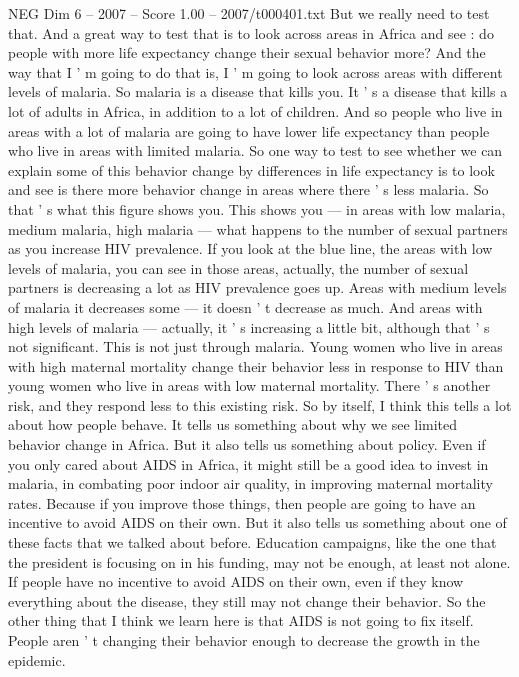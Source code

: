 \begin{textsample}{NEG Dim 6 – 2007 – Score 1.00 – 2007/t000401.txt}
But we really need to test that.
And a great way to test that is to look across areas in Africa and see : do people with more life expectancy change their sexual behavior more?
And the way that I ' m going to do that is, I ' m going to look across areas with different levels of malaria.
So malaria is a disease that kills you.
It ' s a disease that kills a lot of adults in Africa, in addition to a lot of children.
And so people who live in areas with a lot of malaria are going to have lower life expectancy than people who live in areas with limited malaria.
So one way to test to see whether we can explain some of this behavior change by differences in life expectancy is to look and see is there more behavior change in areas where there ' s less malaria.
So that ' s what this figure shows you.
This shows you — in areas with low malaria, medium malaria, high malaria — what happens to the number of sexual partners as you increase HIV prevalence.
If you look at the blue line, the areas with low levels of malaria, you can see in those areas, actually, the number of sexual partners is decreasing a lot as HIV prevalence goes up.
Areas with medium levels of malaria it decreases some — it doesn ' t decrease as much.
And areas with high levels of malaria — actually, it ' s increasing a little bit, although that ' s not significant.
This is not just through malaria.
Young women who live in areas with high maternal mortality change their behavior less in response to HIV than young women who live in areas with low maternal mortality.
There ' s another risk, and they respond less to this existing risk.
So by itself, I think this tells a lot about how people behave.
It tells us something about why we see limited behavior change in Africa.
But it also tells us something about policy.
Even if you only cared about AIDS in Africa, it might still be a good idea to invest in malaria, in combating poor indoor air quality, in improving maternal mortality rates.
Because if you improve those things, then people are going to have an incentive to avoid AIDS on their own.
But it also tells us something about one of these facts that we talked about before.
Education campaigns, like the one that the president is focusing on in his funding, may not be enough, at least not alone.
If people have no incentive to avoid AIDS on their own, even if they know everything about the disease, they still may not change their behavior.
So the other thing that I think we learn here is that AIDS is not going to fix itself.
People aren ' t changing their behavior enough to decrease the growth in the epidemic.

\end{textsample}

